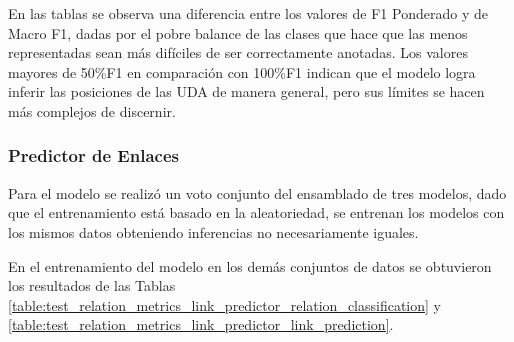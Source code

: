 \documentclass{rcci} %
\begin{document}
\begin{table}[!ht]
	\centering
	\caption{\fontsize{11}{12}\selectfont M\'etricas BIOES de las pruebas del segmentador de UDA.}
	\label{table:test_bioes_metrics_segmenter}
	\begin{threeparttable}[b]
		\fontsize{9}{11}
	\end{threeparttable}
\end{table}

En las tablas se observa una diferencia entre los valores de F1 Ponderado y 
de Macro F1, dadas por el pobre balance de las clases que hace que las menos
representadas sean m\'as dif\'iciles de ser correctamente anotadas. Los valores
mayores de 50\%F1 en comparaci\'on con 100\%F1 indican que el modelo logra 
inferir las posiciones de las UDA de manera general, pero sus l\'imites se hacen 
m\'as complejos de discernir. 

\subsubsection*{Predictor de Enlaces}

Para el modelo se realiz\'o un voto conjunto del ensamblado de tres modelos, dado que el entrenamiento 
est\'a basado en la aleatoriedad, se entrenan los modelos con los mismos datos obteniendo inferencias no
necesariamente iguales.

En el entrenamiento del modelo en los dem\'as conjuntos de datos se obtuvieron los resultados de las Tablas 
\ref{table:test_relation_metrics_link_predictor_relation_classification} y 
\ref{table:test_relation_metrics_link_predictor_link_prediction}.
\end{document}
